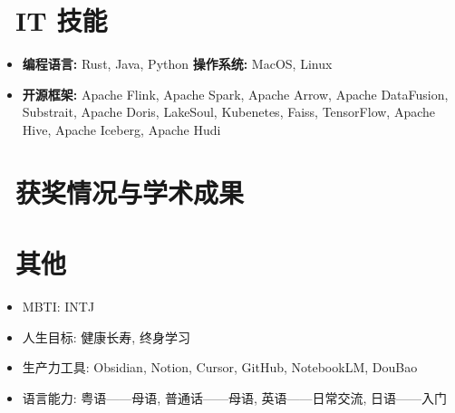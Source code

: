 \documentclass{resume}
\begin{document}
\section{\faCogs\ IT 技能}
\begin{itemize}[itemsep=0.2em]
  \item \textbf{编程语言:} Rust, Java, Python \hspace{2em} \textbf{操作系统:} MacOS, Linux
  \item \textbf{开源框架:} Apache Flink, Apache Spark, Apache Arrow, Apache DataFusion, Substrait, Apache Doris, LakeSoul, Kubenetes, Faiss, TensorFlow, Apache Hive, Apache Iceberg, Apache Hudi
\end{itemize}

\section{\faHeartO\ 获奖情况与学术成果}

\section{\faInfo\ 其他}
\begin{itemize}
  \item MBTI: INTJ
  \item 人生目标: 健康长寿, 终身学习
  \item 生产力工具: Obsidian, Notion, Cursor, GitHub, NotebookLM, DouBao
  \item 语言能力: 粤语——母语, 普通话——母语, 英语——日常交流, 日语——入门
\end{itemize}
\end{document}
